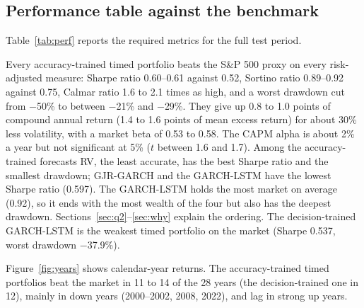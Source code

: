 \FloatBarrier
\subsection{Performance table against the benchmark}
Table~\ref{tab:perf} reports the required metrics for the full test period.

Every accuracy-trained timed portfolio beats the S\&P 500 proxy on every risk-adjusted measure: Sharpe ratio 0.60--0.61 against 0.52, Sortino ratio 0.89--0.92 against 0.75, Calmar ratio 1.6 to 2.1 times as high, and a worst drawdown cut from $-$50\% to between $-$21\% and $-$29\%. They give up 0.8 to 1.0 points of compound annual return (1.4 to 1.6 points of mean excess return) for about 30\% less volatility, with a market beta of 0.53 to 0.58. The CAPM alpha is about 2\% a year but not significant at 5\% ($t$ between 1.6 and 1.7). Among the accuracy-trained forecasts RV, the least accurate, has the best Sharpe ratio and the smallest drawdown; GJR-GARCH and the GARCH-LSTM have the lowest Sharpe ratio (0.597). The GARCH-LSTM holds the most market on average (0.92), so it ends with the most wealth of the four but also has the deepest drawdown. Sections~\ref{sec:q2}--\ref{sec:why} explain the ordering. The decision-trained GARCH-LSTM is the weakest timed portfolio on the market (Sharpe 0.537, worst drawdown $-$37.9\%).

Figure~\ref{fig:years} shows calendar-year returns. The accuracy-trained timed portfolios beat the market in 11 to 14 of the 28 years (the decision-trained one in 12), mainly in down years (2000--2002, 2008, 2022), and lag in strong up years.

